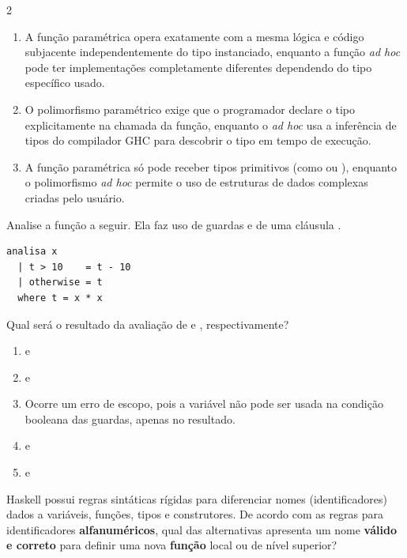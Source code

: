 \documentclass[a4paper,10pt,brazil]{article}
\begin{document}
\begin{multicols}{2}
\begin{enumerate}
  \item A função paramétrica opera exatamente com a mesma lógica e código subjacente independentemente do tipo instanciado, enquanto a função \emph{ad hoc} pode ter implementações completamente diferentes dependendo do tipo específico usado.

  \item O polimorfismo paramétrico exige que o programador declare o tipo explicitamente na chamada da função, enquanto o \emph{ad hoc} usa a inferência de tipos do compilador GHC para descobrir o tipo em tempo de execução.

  \item A função paramétrica só pode receber tipos primitivos (como  ou ), enquanto o polimorfismo \emph{ad hoc} permite o uso de estruturas de dados complexas criadas pelo usuário.


\end{enumerate}

Analise a função a seguir. Ela faz uso de guardas e de uma cláusula .

\begin{verbatim}
analisa x
  | t > 10    = t - 10
  | otherwise = t
  where t = x * x
\end{verbatim}

Qual será o resultado da avaliação de  e , respectivamente?

\begin{enumerate}
  \item {} e 

  \item {} e 

  \item Ocorre um erro de escopo, pois a variável  não pode ser usada na condição booleana das guardas, apenas no resultado.

  \item {} e 

  \item {} e 


\end{enumerate}

Haskell possui regras sintáticas rígidas para diferenciar nomes (identificadores) dados a variáveis, funções, tipos e construtores. De acordo com as regras para identificadores \textbf{alfanuméricos}, qual das alternativas apresenta um nome \textbf{válido e correto} para definir uma nova \textbf{função} local ou de nível superior?


\end{multicols}
\end{document}
